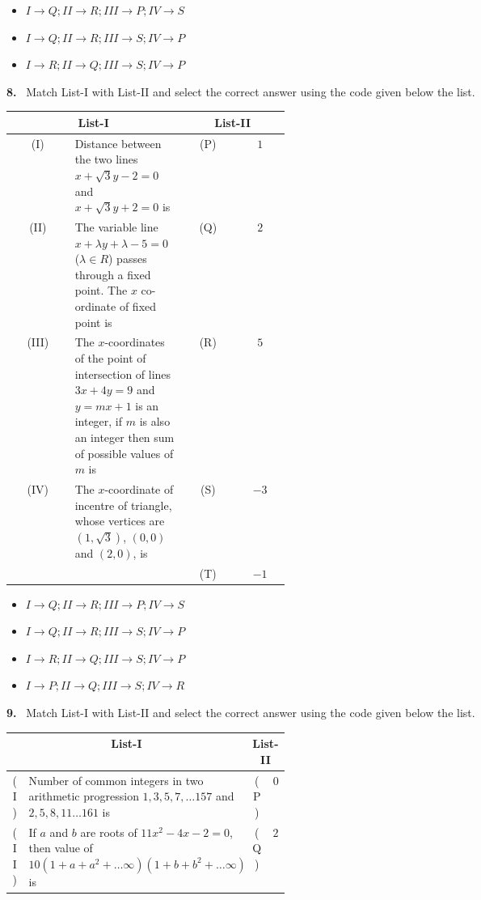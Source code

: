 \documentclass[10pt]{extarticle}
\newcommand{\qn}[1]{\par\smallskip\noindent\textbf{#1.}~}
\newenvironment{qoptions}{\begin{itemize}[leftmargin=1.8em,itemsep=1pt,topsep=2pt,label={}]}{\end{itemize}}
\newcommand{\opt}[2]{\item[(#1)] #2}
\begin{document}
\begin{multicols}{2}
\begin{qoptions}
\opt{B}{$I\to Q;\allowbreak II\to R;\allowbreak III\to P;\allowbreak IV\to S$}
\opt{C}{$I\to Q;\allowbreak II\to R;\allowbreak III\to S;\allowbreak IV\to P$}
\opt{D}{$I\to R;\allowbreak II\to Q;\allowbreak III\to S;\allowbreak IV\to P$}
\end{qoptions}
\qn{8} Match List-I with List-II and select the correct answer using the code given below the list.\par
{\small\setlength{\tabcolsep}{2pt}\begin{tabular}{|c|p{0.4\linewidth}|c|c|}
\hline
\multicolumn{2}{|c|}{\textbf{List-I}} & \multicolumn{2}{c|}{\textbf{List-II}}\\ \hline
(I) & Distance between the two lines $x+\sqrt3y-2=0$ and $x+\sqrt3y+2=0$ is & (P) & $1$\\ \hline
(II) & The variable line $x+\lambda y+\lambda-5=0$ ($\lambda\in R$) passes through a fixed point. The $x$ co-ordinate of fixed point is & (Q) & $2$\\ \hline
(III) & The $x$-coordinates of the point of intersection of lines $3x+4y=9$ and $y=mx+1$ is an integer, if $m$ is also an integer then sum of possible values of $m$ is & (R) & $5$\\ \hline
(IV) & The $x$-coordinate of incentre of triangle, whose vertices are $(1,\sqrt3)$, $(0,0)$ and $(2,0)$, is & (S) & $-3$\\ \hline
 & & (T) & $-1$\\ \hline
\end{tabular}}\par
\begin{qoptions}
\opt{A}{$I\to Q;\allowbreak II\to R;\allowbreak III\to P;\allowbreak IV\to S$}
\opt{B}{$I\to Q;\allowbreak II\to R;\allowbreak III\to S;\allowbreak IV\to P$}
\opt{C}{$I\to R;\allowbreak II\to Q;\allowbreak III\to S;\allowbreak IV\to P$}
\opt{D}{$I\to P;\allowbreak II\to Q;\allowbreak III\to S;\allowbreak IV\to R$}
\end{qoptions}
\qn{9} Match List-I with List-II and select the correct answer using the code given below the list.\par
{\small\setlength{\tabcolsep}{2pt}\begin{tabular}{|c|p{0.4\linewidth}|c|c|}
\hline
\multicolumn{2}{|c|}{\textbf{List-I}} & \multicolumn{2}{c|}{\textbf{List-II}}\\ \hline
(I) & Number of common integers in two arithmetic progression $1,3,5,7,\ldots157$ and $2,5,8,11\ldots161$ is & (P) & $0$\\ \hline
(II) & If $a$ and $b$ are roots of $11x^2-4x-2=0$, then value of $10(1+a+a^2+\ldots\infty)(1+b+b^2+\ldots\infty)$ is & (Q) & $26$\\ \hline

\end{tabular}}
\end{multicols}
\end{document}
